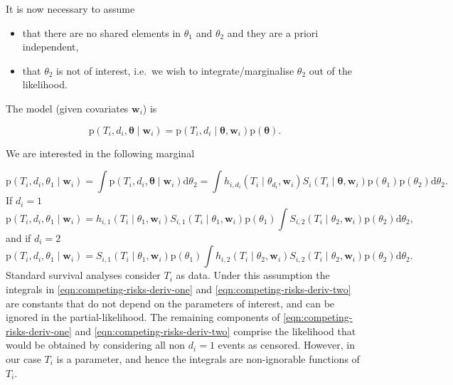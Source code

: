 \documentclass[
  10pt,
  a4paper,
]{article}
\providecommand{\tightlist}{%
  \setlength{\itemsep}{0pt}\setlength{\parskip}{0pt}}
\newcommand{\pd}{\text{p}}
\begin{document}
It is now necessary to assume

\begin{itemize}
\tightlist
\item
  that there are no shared elements in \(\theta_{1}\) and \(\theta_{2}\)
  and they are a priori independent,
\item
  that \(\theta_{2}\) is not of interest, i.e.~we wish to
  integrate/marginalise \(\theta_{2}\) out of the likelihood.
\end{itemize}

The model (given covariates \(\boldsymbol{w}_{i}\)) is

\begin{equation}
  \pd(T_{i}, d_{i}, \boldsymbol{\theta} \mid \boldsymbol{w}_{i}) =
    \pd(T_{i}, d_{i} \mid \boldsymbol{\theta}, \boldsymbol{w}_{i})\pd(\boldsymbol{\theta}).
\end{equation}

We are interested in the following marginal

\begin{equation}
  \pd(T_{i}, d_{i}, \theta_{1} \mid \boldsymbol{w}_{i})
  = \int \pd(T_{i}, d_{i}, \boldsymbol{\theta} \mid \boldsymbol{w}_{i}) \text{d}\theta_{2}
  = \int h_{i, d_{i}}(T_{i} \mid \theta_{d_{i}}, \boldsymbol{w}_{i}) S_{i}(T_{i} \mid \boldsymbol{\theta}, \boldsymbol{w}_{i}) \pd(\theta_{1}) \pd(\theta_{2}) \text{d}\theta_{2}.
\end{equation} If \(d_{i} = 1\) \begin{equation}
  \pd(T_{i}, d_{i}, \theta_{1} \mid \boldsymbol{w}_{i})
  = h_{i, 1}(T_{i} \mid \theta_{1}, \boldsymbol{w}_{i}) S_{i, 1}(T_{i} \mid \theta_{1}, \boldsymbol{w}_{i}) \pd(\theta_{1}) \int S_{i, 2}(T_{i} \mid \theta_{2}, \boldsymbol{w}_{i}) \pd(\theta_{2}) \text{d} \theta_{2},
  \label{eqn:competing-risks-deriv-one}
\end{equation} and if \(d_{i} = 2\) \begin{equation}
  \pd(T_{i}, d_{i}, \theta_{1} \mid \boldsymbol{w}_{i})
  = S_{i, 1}(T_{i} \mid \theta_{1}, \boldsymbol{w}_{i}) \pd(\theta_{1}) \int h_{i, 2}(T_{i} \mid \theta_{2}, \boldsymbol{w}_{i}) S_{i, 2}(T_{i} \mid \theta_{2}, \boldsymbol{w}_{i}) \pd(\theta_{2}) \text{d} \theta_{2}.
  \label{eqn:competing-risks-deriv-two}
\end{equation} Standard survival analyses consider \(T_{i}\) as data.
Under this assumption the integrals in
\eqref{eqn:competing-risks-deriv-one} and
\eqref{eqn:competing-risks-deriv-two} are constants that do not depend
on the parameters of interest, and can be ignored in the
partial-likelihood. The remaining components of
\eqref{eqn:competing-risks-deriv-one} and
\eqref{eqn:competing-risks-deriv-two} comprise the likelihood that would
be obtained by considering all non \(d_{i} = 1\) events as censored.
However, in our case \(T_{i}\) is a parameter, and hence the integrals
are non-ignorable functions of \(T_{i}\).
\end{document}

